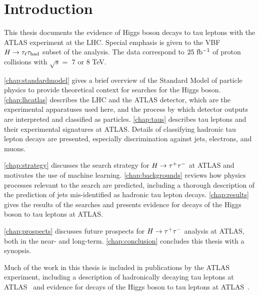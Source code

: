 \chapter[Introduction][Introduction]{Introduction}
\label{chap:introduction}

This thesis documents the evidence of Higgs boson decays to tau leptons with the ATLAS experiment at the LHC. Special emphasis is given to the VBF $H\rightarrow\tau_\ell\tau_\text{had}$ subset of the analysis. The data correspond to $25\ \ifb$ of proton collisions with $\sqrt{s} = $ 7 or 8 TeV.

\cref{chap:standardmodel} gives a brief overview of the Standard Model of particle physics to provide theoretical context for searches for the Higgs boson. \cref{chap:lhcatlas} describes the LHC and the ATLAS detector, which are the experimental apparatuses used here, and the process by which detector outputs are interpreted and classified as particles. \cref{chap:taus} describes tau leptons and their experimental signatures at ATLAS. Details of classifying hadronic tau lepton decays are presented, especially discrimination against jets, electrons, and muons.

\cref{chap:strategy} discusses the search strategy for ${H\rightarrow \tau^{+}\tau^{-}}$ at ATLAS and motivates the use of machine learning. \cref{chap:backgrounds} reviews how physics processes relevant to the search are predicted, including a thorough description of the prediction of jets mis-identified as hadronic tau lepton decays. \cref{chap:results} gives the results of the searches and presents evidence for decays of the Higgs boson to tau leptons at ATLAS.

\cref{chap:prospects} discusses future prospects for ${H\rightarrow \tau^{+}\tau^{-}}$ analysis at ATLAS, both in the near- and long-term. \cref{chap:conclusion} concludes this thesis with a synopsis.

Much of the work in this thesis is included in publications by the ATLAS experiment, including a description of hadronically decaying tau leptons at ATLAS~\cite{PERF-2013-06} and evidence for decays of the Higgs boson to tau leptons at ATLAS~\cite{HIGG-2013-32}.

